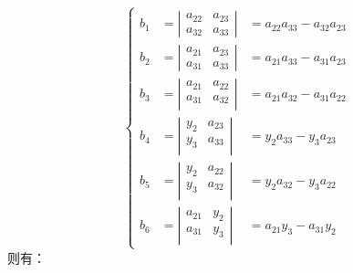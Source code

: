 \begin{equation*}
  \left\{
    \begin{array}{lll}
        b_1 &= \left|
        \begin{array}{cc}
          a_{22} & a_{23} \\
          a_{32} & a_{33} 
        \end{array} 
        \right|
         &= a_{22}a_{33} - a_{32}a_{23}
        \\
        b_2 &= \left|
        \begin{array}{cc}
          a_{21} & a_{23} \\
          a_{31} & a_{33} 
        \end{array} 
        \right|
          &= a_{21}a_{33} - a_{31}a_{23}
        \\
        b_3 &= \left|
        \begin{array}{cc}
          a_{21} & a_{22} \\
          a_{31} & a_{32} \\
        \end{array}
        \right|
        &= a_{21}a_{32}-a_{31}a_{22}
        \\
        b_4 &= \left|
          \begin{array}{cc}
            y_2 & a_{23} \\
            y_3 & a_{33} \\
          \end{array}
        \right|
         & = y_2a_{33}-y_3a_{23}
        \\
        b_5 &= \left|
          \begin{array}{cc}
              y_2 & a_{22} \\
              y_3 & a_{32} \\
              \end{array}
            \right|
          &= y_2a_{32}-y_3a_{22}
        \\
        b_6 &= \left|
            \begin{array}{cc}
              a_{21} & y_{2} \\
              a_{31} & y_{3} \\
            \end{array}
          \right|
          &=a_{21}y_{3}-a_{31}y_{2}
    \end{array}
\right.
\end{equation*}
则有：

